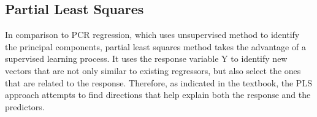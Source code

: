 \documentclass{article}
\begin{document}
\subsection{Partial Least Squares}

In comparison to PCR regression, which uses unsupervised method to identify the principal components, partial least squares method takes the advantage of a supervised learning process. It uses the response variable Y to identify new vectors that are not only similar to existing regressors, but also select the ones that are related to the response. Therefore, as indicated in the textbook, the PLS approach attempts to find directions that help explain both the response and the predictors. 
\end{document}
